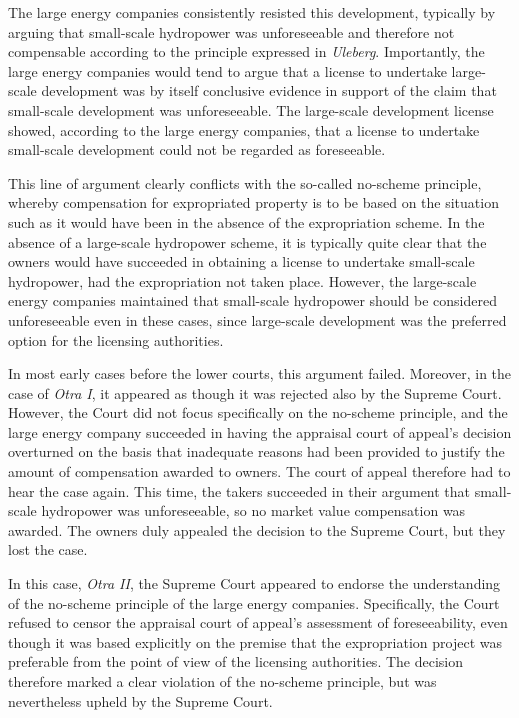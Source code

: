 The large energy companies consistently resisted this development, typically by arguing that small-scale hydropower was unforeseeable and therefore not compensable according to the principle expressed in {\it Uleberg}. Importantly, the large energy companies would tend to argue that a license to undertake large-scale development was by itself conclusive evidence in support of the claim that small-scale development was unforeseeable. The large-scale development license showed, according to the large energy companies, that a license to undertake small-scale development could not be regarded as foreseeable.

This line of argument clearly conflicts with the so-called no-scheme principle, whereby compensation for expropriated property is to be based on the situation such as it would have been in the absence of the expropriation scheme. In the absence of a large-scale hydropower scheme, it is typically quite clear that the owners would have succeeded in obtaining a license to undertake small-scale hydropower, had the expropriation not taken place. However, the large-scale energy companies maintained that small-scale hydropower should be considered unforeseeable even in these cases, since large-scale development was the preferred option for the licensing authorities.

In most early cases before the lower courts, this argument failed. Moreover, in the case of {\it Otra I}, it appeared as though it was rejected also by the Supreme Court. However, the Court did not focus specifically on the no-scheme principle, and the large energy company succeeded in having the appraisal court of appeal's decision overturned on the basis that inadequate reasons had been provided to justify the amount of compensation awarded to owners. The court of appeal therefore had to hear the case again. This time, the takers succeeded in their argument that small-scale hydropower was unforeseeable, so no market value compensation was awarded. The owners duly appealed the decision to the Supreme Court, but they lost the case.

In this case, {\it Otra II}, the Supreme Court appeared to endorse the understanding of the no-scheme principle of the large energy companies. Specifically, the Court refused to censor the appraisal court of appeal's assessment of foreseeability, even though it was based explicitly on the premise that the expropriation project was preferable from the point of view of the licensing authorities. The decision therefore marked a clear violation of the no-scheme principle, but was nevertheless upheld by the Supreme Court.


